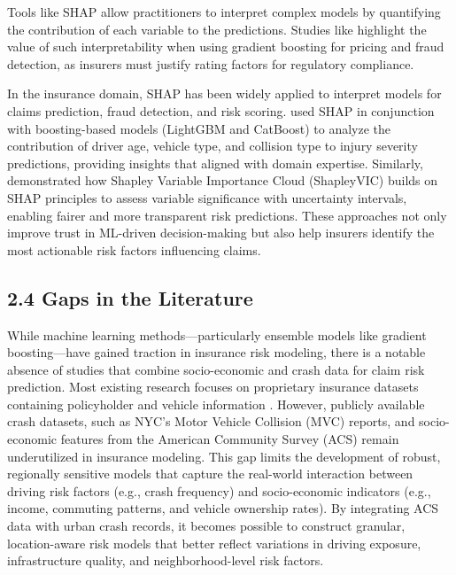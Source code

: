 \documentclass[
  number,
  review,
  3p]{elsarticle}
\begin{document}
Tools like SHAP allow practitioners to interpret complex models by
quantifying the contribution of each variable to the predictions.
Studies like \citet{mohamed} highlight the value of such
interpretability when using gradient boosting for pricing and fraud
detection, as insurers must justify rating factors for regulatory
compliance.

In the insurance domain, SHAP has been widely applied to interpret
models for claims prediction, fraud detection, and risk scoring.
\citet{dong} used SHAP in conjunction with boosting-based models
(LightGBM and CatBoost) to analyze the contribution of driver age,
vehicle type, and collision type to injury severity predictions,
providing insights that aligned with domain expertise. Similarly,
\citet{ning} demonstrated how Shapley Variable Importance Cloud
(ShapleyVIC) builds on SHAP principles to assess variable significance
with uncertainty intervals, enabling fairer and more transparent risk
predictions. These approaches not only improve trust in ML-driven
decision-making but also help insurers identify the most actionable risk
factors influencing claims.

\subsection{\texorpdfstring{\textbf{2.4 Gaps in the
Literature}}{2.4 Gaps in the Literature}}\label{gaps-in-the-literature}

While machine learning methods---particularly ensemble models like
gradient boosting---have gained traction in insurance risk modeling,
there is a notable absence of studies that combine socio-economic and
crash data for claim risk prediction. Most existing research focuses on
proprietary insurance datasets containing policyholder and vehicle
information \citep{clemente, henckaerts, jonkheijm}. However, publicly
available crash datasets, such as NYC's Motor Vehicle Collision (MVC)
reports, and socio-economic features from the American Community Survey
(ACS) remain underutilized in insurance modeling. This gap limits the
development of robust, regionally sensitive models that capture the
real-world interaction between driving risk factors (e.g., crash
frequency) and socio-economic indicators (e.g., income, commuting
patterns, and vehicle ownership rates). By integrating ACS data with
urban crash records, it becomes possible to construct granular,
location-aware risk models that better reflect variations in driving
exposure, infrastructure quality, and neighborhood-level risk factors.
\end{document}
